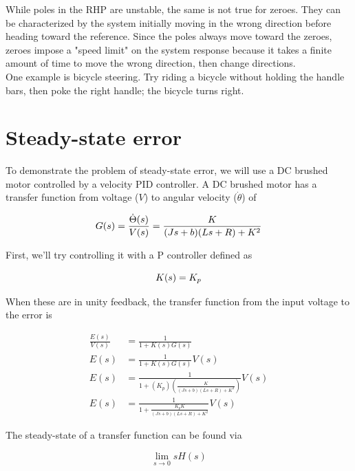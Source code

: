 \documentclass[10pt,conference,compsoc]{IEEEtran}
\begin{document}
While poles in the RHP are unstable, the same is not true for zeroes. They can
be characterized by the \gls{system} initially moving in the wrong direction
before heading toward the \gls{reference}. Since the poles always move toward
the zeroes, zeroes impose a "speed limit" on the \gls{system} response because
it takes a finite amount of time to move the wrong direction, then change
directions. \\

One example is bicycle steering. Try riding a bicycle without holding the handle
bars, then poke the right handle; the bicycle turns right.

\section{Steady-state error}

To demonstrate the problem of \gls{steady-state error}, we will use a DC brushed
motor controlled by a velocity PID controller. A DC brushed motor has a transfer
function from voltage ($V$) to angular velocity ($\dot{\theta}$) of

\begin{equation}
  G(s) = \frac{\dot{\Theta}(s)}{V(s)} = \frac{K}{(Js+b)(Ls+R)+K^2} \\
\end{equation}

First, we'll try controlling it with a P controller defined as

\begin{equation*}
  K(s) = K_p \\
\end{equation*}

When these are in unity feedback, the transfer function from the input voltage
to the error is

\begin{align*}
  \frac{E(s)}{V(s)} &= \frac{1}{1 + K(s)G(s)} \\
  E(s) &= \frac{1}{1 + K(s)G(s)} V(s) \\
  E(s) &= \frac{1}{1 + (K_p) \left(\frac{K}{(Js+b)(Ls+R)+K^2}\right)} V(s) \\
  E(s) &= \frac{1}{1 + \frac{K_p K}{(Js+b)(Ls+R)+K^2}} V(s)
\end{align*}

The steady-state of a transfer function can be found via

\begin{equation}
  \lim_{s\to0} sH(s)
\end{equation}
\end{document}
